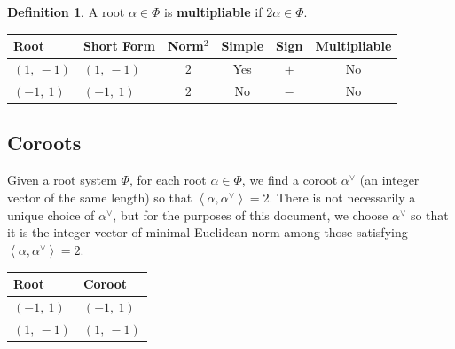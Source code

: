\documentclass[11pt]{article}
\newcommand{\noi}{\noindent}
\newcommand{\tbf}{\textbf}
\newcommand{\la}{\left\langle}
\newcommand{\ra}{\right\rangle}
\theoremstyle{definition}
\newtheorem{definition}{Definition}[section]
\newif\ifsummablepairs
\begin{document}
\begin{definition}
A root $\alpha \in \Phi$ is \tbf{multipliable} if $2\alpha \in \Phi$.
\end{definition}

\noi \begin{tabular}{|l|l|c|c|c|c|}
    \hline
    \textbf{Root} & \textbf{Short Form} & \textbf{Norm$^2$} & \textbf{Simple} & \textbf{Sign} & \textbf{Multipliable} \\
    \hline
    $\left( 1, \  -1\right)$ & $\left( 1, \  -1\right)$ & $2$ & Yes & $+$ & No \\
    \hline
    $\left( -1, \  1\right)$ & $\left( -1, \  1\right)$ & $2$ & No & $-$ & No \\
    \hline
\end{tabular}


\subsection{Coroots}

Given a root system $\Phi$, for each root $\alpha \in \Phi$, we find a coroot $\alpha^\vee$ (an integer vector of the same length) so that $\la \alpha, \alpha^\vee \ra = 2$. There is not necessarily a unique choice of $\alpha^\vee$, but for the purposes of this document, we choose $\alpha^\vee$ so that it is the integer vector of minimal Euclidean norm among those satisfying $\la \alpha, \alpha^\vee \ra = 2$.

\bigskip

\noindent \begin{tabular}{|l|l|}
    \hline
    \textbf{Root} & \textbf{Coroot} \\
    \hline
    $\left( -1, \  1\right)$ & $\left( -1, \  1\right)$ \\
    \hline
    $\left( 1, \  -1\right)$ & $\left( 1, \  -1\right)$ \\
    \hline
\end{tabular}


\ifsummablepairs
\subsection{Linear combinations of roots}

\begin{definition}
For two roots $\alpha, \beta$ in a root system $\Phi$, the set of positive integral linear combinations of $\alpha, \beta$ that are also roots is denoted
\(
	(\alpha, \beta) = \{ i \alpha + j \beta \in \Phi : i, j \in \mathbb{Z}_{\ge 1} \}
\).
\end{definition}
\noi 
\fi
\end{document}
